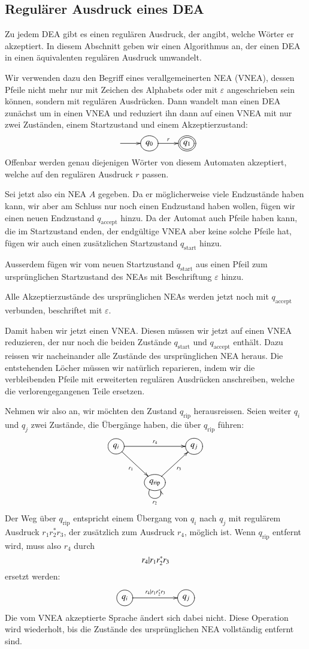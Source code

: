 \subsection{Regulärer Ausdruck eines DEA\label{regulaer:dea-re}}
Zu jedem DEA gibt es einen regulären Ausdruck, der angibt,
welche Wörter er akzeptiert.
In diesem Abschnitt geben
wir einen Algorithmus an, der einen DEA in einen äquivalenten
regulären Ausdruck umwandelt.

%
%
Wir verwenden dazu den Begriff eines verallgemeinerten NEA (VNEA),
dessen Pfeile nicht mehr nur mit Zeichen des Alphabets oder mit
$\varepsilon$ angeschrieben sein können, sondern mit regulären
Ausdrücken.
Dann wandelt man einen DEA zunächst um in einen
VNEA und reduziert ihn dann auf einen VNEA mit nur zwei Zuständen,
einem Startzustand und einem Akzeptierzustand:
\[
\entrymodifiers={++[o][F]}
\xymatrix{
*+\txt{}\ar[r]
	&{q_0}\ar[r]^{r}
		&*++[o][F=]{q_1}
}
\]
Offenbar werden genau diejenigen Wörter von diesem Automaten
akzeptiert, welche auf den regulären Ausdruck $r$ passen.

Sei jetzt also ein NEA $A$ gegeben.
Da er möglicherweise viele
Endzustände haben kann, wir aber am Schluss nur noch einen
Endzustand haben wollen, fügen wir einen neuen Endzustand
$q_{\text{accept}}$ hinzu.
Da der Automat auch Pfeile haben kann, die im Startzustand enden,
der endgültige VNEA aber keine solche Pfeile hat, fügen wir
auch einen zusätzlichen Startzustand $q_{\text{start}}$ hinzu.

Ausserdem fügen wir vom neuen Startzustand $q_{\text{start}}$
aus einen Pfeil zum ursprünglichen Startzustand des NEAs mit Beschriftung $\varepsilon$ hinzu.

Alle Akzeptierzustände des ursprünglichen NEAs werden jetzt noch mit
$q_{\text{accept}}$ verbunden, beschriftet mit $\varepsilon$.

Damit haben wir jetzt einen VNEA.
Diesen müssen wir jetzt auf einen VNEA reduzieren, der nur noch
die beiden Zustände $q_{\text{start}}$ und $q_{\text{accept}}$
enthält.
Dazu reissen wir nacheinander alle Zustände des ursprünglichen
NEA heraus.
Die entstehenden Löcher müssen wir natürlich reparieren, indem wir die
verbleibenden Pfeile mit erweiterten regulären Ausdrücken
anschreiben, welche die verlorengegangenen Teile ersetzen.

Nehmen wir also an, wir möchten den Zustand $q_ {\text{rip}}$
herausreissen.
Seien weiter $q_i$ und $q_j$ zwei Zustände, die
Übergänge haben, die über $q_{\text{rip}}$ führen:
\[
\entrymodifiers={++[o][F]}
\xymatrix{
{q_i}\ar[rr]^{r_4} \ar[dr]_{r_1}
	&*+\txt{}
		&{q_j}
\\
*+\txt{}
	&{q_{\text{rip}}}\ar[ur]_{r_3} \ar@(dl,dr)_{r_2}
}
\]
Der Weg über $q_{\text{rip}}$ entspricht einem Übergang
von $q_i$ nach $q_j$ mit regulärem Ausdruck $r_1r_2^*r_3$,
der zusätzlich zum Ausdruck $r_4$, möglich ist.
Wenn $q_{\text{rip}}$ entfernt wird, muss also $r_4$ durch 
\[
r_4{\tt |}r_1r_2^{\tt *}r_3
\]
ersetzt werden:
\[
\entrymodifiers={++[o][F]}
\xymatrix{
{q_i}\ar[rr]^{r_4|r_1r_2^*r_3}
	&*+\txt{}
		&{q_j}
}
\]
Die vom VNEA akzeptierte Sprache ändert sich dabei nicht.
Diese Operation wird wiederholt, bis die Zustände des ursprünglichen
NEA vollständig entfernt sind.

